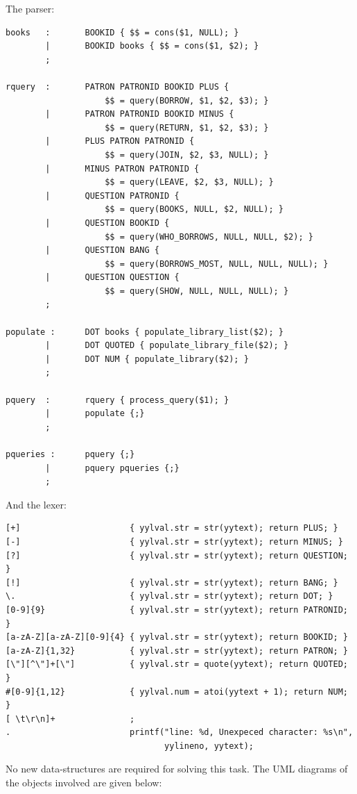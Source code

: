 \documentclass[11pt]{article}
\begin{document}
The parser:
\begin{verbatim}
books   :       BOOKID { $$ = cons($1, NULL); }
        |       BOOKID books { $$ = cons($1, $2); }
        ;

rquery  :       PATRON PATRONID BOOKID PLUS {
                    $$ = query(BORROW, $1, $2, $3); }
        |       PATRON PATRONID BOOKID MINUS {
                    $$ = query(RETURN, $1, $2, $3); }
        |       PLUS PATRON PATRONID {
                    $$ = query(JOIN, $2, $3, NULL); }
        |       MINUS PATRON PATRONID {
                    $$ = query(LEAVE, $2, $3, NULL); }
        |       QUESTION PATRONID {
                    $$ = query(BOOKS, NULL, $2, NULL); }
        |       QUESTION BOOKID {
                    $$ = query(WHO_BORROWS, NULL, NULL, $2); }
        |       QUESTION BANG {
                    $$ = query(BORROWS_MOST, NULL, NULL, NULL); }
        |       QUESTION QUESTION {
                    $$ = query(SHOW, NULL, NULL, NULL); }
        ;

populate :      DOT books { populate_library_list($2); }
        |       DOT QUOTED { populate_library_file($2); }
        |       DOT NUM { populate_library($2); }
        ;

pquery  :       rquery { process_query($1); }
        |       populate {;}
        ;

pqueries :      pquery {;}
        |       pquery pqueries {;}
        ;
\end{verbatim}

And the lexer:
\begin{verbatim}
[+]                      { yylval.str = str(yytext); return PLUS; }
[-]                      { yylval.str = str(yytext); return MINUS; }
[?]                      { yylval.str = str(yytext); return QUESTION; }
[!]                      { yylval.str = str(yytext); return BANG; }
\.                       { yylval.str = str(yytext); return DOT; }
[0-9]{9}                 { yylval.str = str(yytext); return PATRONID; }
[a-zA-Z][a-zA-Z][0-9]{4} { yylval.str = str(yytext); return BOOKID; }
[a-zA-Z]{1,32}           { yylval.str = str(yytext); return PATRON; }
[\"][^\"]+[\"]           { yylval.str = quote(yytext); return QUOTED; }
#[0-9]{1,12}             { yylval.num = atoi(yytext + 1); return NUM; }
[ \t\r\n]+               ;
.                        printf("line: %d, Unexpeced character: %s\n",
                                yylineno, yytext);
\end{verbatim}

No new data-structures are required for solving this task.  The UML diagrams
of the objects involved are given below:
\end{document}
